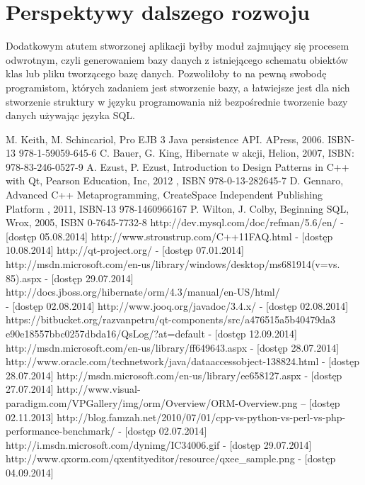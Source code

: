 \documentclass[12pt]{report}
\begin{document}
\section{Perspektywy dalszego rozwoju}
Dodatkowym atutem stworzonej aplikacji byłby moduł zajmujący się procesem odwrotnym, czyli generowaniem bazy danych z istniejącego schematu obiektów klas lub pliku tworzącego bazę danych. Pozwoliłoby to na pewną swobodę programistom, których zadaniem jest stworzenie bazy, a łatwiejsze jest dla nich stworzenie struktury w języku programowania niż bezpośrednie tworzenie bazy danych używając języka SQL.
\begin{thebibliography}{99}
	 {M. Keith, M. Schincariol, Pro EJB 3 Java persistence API. APress, 2006. ISBN-13 978-1-59059-645-6}
	 {C. Bauer, G. King, Hibernate w akcji, Helion, 2007, ISBN: 978-83-246-0527-9}
	 {A. Ezust, P. Ezust, Introduction to Design Patterns in C++ with Qt, Pearson Education, Inc, 2012 , ISBN 978-0-13-282645-7}
	 {D. Gennaro, Advanced C++ Metaprogramming, CreateSpace Independent Publishing Platform , 2011, ISBN-13 978-1460966167}
	 {P. Wilton, J. Colby, Beginning SQL, Wrox, 2005, ISBN 0-7645-7732-8}
	 {http://dev.mysql.com/doc/refman/5.6/en/ - [dostęp 05.08.2014]}
	 {http://www.stroustrup.com/C++11FAQ.html - [dostęp 10.08.2014]}
	 {http://qt-project.org/ - [dostęp 07.01.2014]}
	 {http://msdn.microsoft.com/en-us/library/windows/desktop/ms681914(v=vs.\\85).aspx - [dostęp 29.07.2014]}
	 {http://docs.jboss.org/hibernate/orm/4.3/manual/en-US/html/\\- [dostęp 02.08.2014]}
	 {http://www.jooq.org/javadoc/3.4.x/ - [dostęp 02.08.2014]}
	 {https://bitbucket.org/razvanpetru/qt-components/src/a476515a5b40479da3\\e90e18557bbc0257dbda16/QsLog/?at=default - [dostęp 12.09.2014]}
	 {http://msdn.microsoft.com/en-us/library/ff649643.aspx - [dostęp 28.07.2014]}
	 {http://www.oracle.com/technetwork/java/dataaccessobject-138824.html - [dostęp 28.07.2014]}
	 {http://msdn.microsoft.com/en-us/library/ee658127.aspx - [dostęp 27.07.2014]}
	 http://www.visual-paradigm.com/VPGallery/img/orm/Overview/ORM-Overview.png --  [dostęp 02.11.2013]
	 http://blog.famzah.net/2010/07/01/cpp-vs-python-vs-perl-vs-php-performance-benchmark/ - [dostęp 02.07.2014]
	 {http://i.msdn.microsoft.com/dynimg/IC34006.gif - [dostęp 29.07.2014]}
	 {http://www.qxorm.com/qxentityeditor/resource/qxee\_sample.png - [dostęp 04.09.2014]}
\end{thebibliography}

\listoffigures

\listoftables
\end{document}
